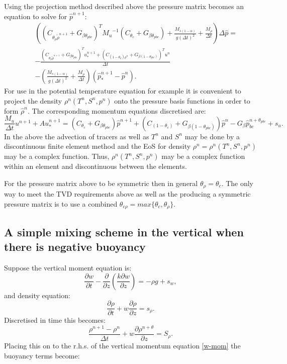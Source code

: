 Using the projection method described above the pressure
matrix becomes an equation to solve for ${\hat p}^{n+1}$:
\begin{eqnarray}
&&\left( ( C_{\theta_\rho \tilde \rho^{n+1}} +G_{\beta\theta_{pbc}})^T
{M_u}^{-1} (  C_{\theta_c} +G_{\beta\theta_{pbc}})
+ \frac{M_{s(1-\alpha)}}{g (\Delta t)^2}
+ \frac{M_{\rho}}{\Delta t} \right) \Delta {\hat p} =  \nonumber\\
&& -\frac{
( C_{\theta_\rho \tilde \rho^{n+1}} +G_{\beta\theta_{pbc}})^T u^{n+1}_*
+( C_{(1-\theta_\rho)\rho^n}+G_{\beta(1-\theta_{pbc})})^T u^{n}
}{\Delta t} \nonumber\\
&&
-\left(\frac{M_{s(1-\alpha)}}{g (\Delta t)^2}+\frac{M_{\rho}}{\Delta t}\right)({\hat p}_*^{n+1}-{\hat p}^{n}).
\label{Ceq5-wet-and-compress}
\end{eqnarray}
For use in the potential temperature equation for example it
is convenient to project the density $\rho^n(  T^{n},  S^{n},  p^{n}) $
onto the pressure basis functions
in order to form $\hat \rho^n$.
The corresponding momentum equations discretised are:
\begin{equation}
\frac{M_u}{\Delta t}u^{n+1}+Au_*^{n+1}=
( C_{\theta_c } +G_{\beta\theta_{pbc}})
{\hat p}^{n+1}
+
( C_{(1-\theta_c)} +G_{\beta(1-\theta_{pbc})})
{\hat p}^n
-G_\beta {\hat p}_{bc}^{n+\theta_{pbc}} +s_u.
\label{WD-eq1-comp}
\end{equation}
In the above the advection of tracers as well as
$T^n$ and $S^n$ may be done by a discontinuous
finite element method and the EoS for density $\rho^n=\rho^{n}
(  T^{n},  S^{n},  p^{n})$ may be a
complex function. Thus, $\rho^{n}
(  T^{n},  S^{n},  p^{n})$ may be a complex function within
an element and discontinuous between the elements.

For the pressure matrix above to be symmetric then
in general $\theta_\rho=\theta_c$. The only way to
meet the TVD requirements above as well as the producing
a symmetric pressure matrix is to use a combined
$\theta_{c\rho}=max\{ \theta_c, \theta_\rho \}$.



\subsection{A simple mixing scheme
in the vertical when there is negative buoyancy}
Suppose the vertical moment equation is:
\begin{equation}
\frac{\partial w}{\partial t} -
 \frac{\partial }{\partial z} \left(
 \frac{ k  \partial w}{\partial z} \right)
= - \rho g + s_w,
\label{w-mom}
\end{equation}
and density equation:
\begin{equation}
\frac{\partial \rho}{\partial t} + w\frac{\partial \rho}{\partial z} = s_\rho.
\label{rho-vert-dif}
\end{equation}
Discretised in time this becomes:
\begin{equation}
\frac{ \rho^{n+1} -\rho^n}{\Delta t}
+w \frac{\partial \rho^{n+\theta}}{\partial z} = S_\rho.
\label{rho-vert-dif-time-disc}
\end{equation}
Placing this on to the r.h.s. of the vertical momentum equation \ref{w-mom}
the buoyancy terms become:

